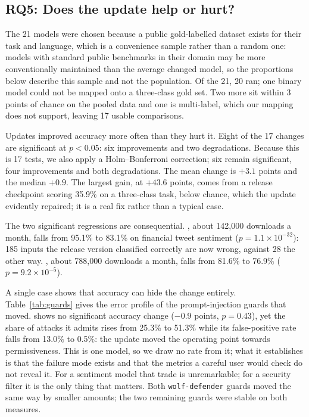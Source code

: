 \documentclass[conference]{IEEEtran}
\newcommand{\code}[1]{\texttt{#1}}
\begin{document}
\subsection{RQ5: Does the update help or hurt?}\label{sec:rq5}
The 21 models were chosen because a public gold-labelled dataset exists for their task and language, which is a convenience sample rather than a random one: models with standard public benchmarks in their domain may be more conventionally maintained than the average changed model, so the proportions below describe this sample and not the population. Of the 21, 20 ran; one binary model could not be mapped onto a three-class gold set. Two more sit within 3 points of chance on the pooled data and one is multi-label, which our mapping does not support, leaving 17 usable comparisons.

Updates improved accuracy more often than they hurt it. Eight of the 17 changes are significant at $p<0.05$: six improvements and two degradations. Because this is 17 tests, we also apply a Holm--Bonferroni correction; six remain significant, four improvements and both degradations. The mean change is $+3.1$ points and the median $+0.9$. The largest gain,  at $+43.6$ points, comes from a release checkpoint scoring 35.9\% on a three-class task, below chance, which the update evidently repaired; it is a real fix rather than a typical case.

The two significant regressions are consequential. , about 142,000 downloads a month, falls from 95.1\% to 83.1\% on financial tweet sentiment ($p = 1.1\times10^{-32}$): 185 inputs the release version classified correctly are now wrong, against 28 the other way. , about 788,000 downloads a month, falls from 81.6\% to 76.9\% ($p = 9.2\times10^{-5}$).

A single case shows that accuracy can hide the change entirely. Table~\ref{tab:guards} gives the error profile of the prompt-injection guards that moved.  shows no significant accuracy change ($-0.9$ points, $p = 0.43$), yet the share of attacks it admits rises from 25.3\% to 51.3\% while its false-positive rate falls from 13.0\% to 0.5\%: the update moved the operating point towards permissiveness. This is one model, so we draw no rate from it; what it establishes is that the failure mode exists and that the metrics a careful user would check do not reveal it. For a sentiment model that trade is unremarkable; for a security filter it is the only thing that matters. Both \code{wolf-defender} guards moved the same way by smaller amounts; the two remaining guards were stable on both measures.
\end{document}
